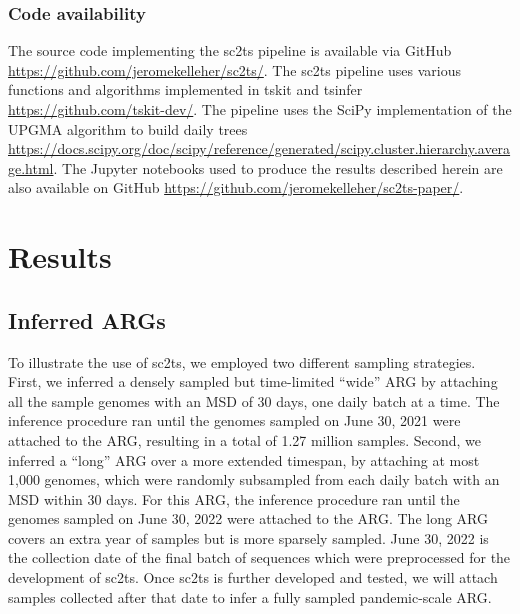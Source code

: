 \documentclass{article}
\begin{document}
\subsubsection{Code availability}

The source code implementing the sc2ts pipeline is available via GitHub
\url{https://github.com/jeromekelleher/sc2ts/}. The sc2ts pipeline uses
various functions and algorithms implemented in tskit and tsinfer
\url{https://github.com/tskit-dev/}. The pipeline uses the SciPy
implementation of the UPGMA algorithm to build daily trees
\url{https://docs.scipy.org/doc/scipy/reference/generated/scipy.cluster.hierarchy.average.html}.
The Jupyter notebooks used to produce the results described herein are also
available on GitHub \url{https://github.com/jeromekelleher/sc2ts-paper/}.

\section{Results}


\subsection{Inferred ARGs}

To illustrate the use of sc2ts, we employed two different sampling strategies.
First, we inferred a densely sampled but time-limited ``wide'' ARG by attaching
all the sample genomes with an MSD of 30 days, one daily batch at a time. The
inference procedure ran until the genomes sampled on June 30, 2021 were
attached to the ARG, resulting in a total of 1.27 million samples. Second, we
inferred a ``long'' ARG over a more extended timespan, by attaching at most 1,000
genomes, which were randomly subsampled from each daily batch with an MSD
within 30 days. For this ARG, the inference procedure ran until the genomes
sampled on June 30, 2022 were attached to the ARG. The long ARG covers an extra
year of samples but is more sparsely sampled. June 30, 2022 is the collection
date of the final batch of sequences which were preprocessed for the
development of sc2ts. Once sc2ts is further developed and tested, we will
attach samples collected after that date to infer a fully sampled
pandemic-scale ARG.
\end{document}
